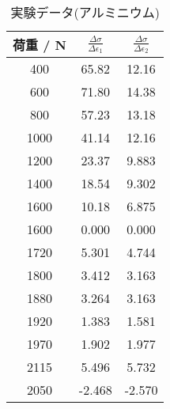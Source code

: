 \begin{table}[h]
  \caption{実験データ(アルミニウム)}
  \label{tab:data_al_2}
  \centering
  \begin{tabular}{ccc}
    \hline
    荷重 / N&$\frac{\Delta\sigma}{\Delta\epsilon_1}$&$\frac{\Delta\sigma}{\Delta\epsilon_2}$\\
    \hline \hline
    400 & 65.82 & 12.16  \\
600 & 71.80 & 14.38  \\
800 & 57.23 & 13.18  \\
1000 & 41.14 & 12.16  \\
1200 & 23.37 & 9.883  \\
1400 & 18.54 & 9.302  \\
1600 & 10.18 & 6.875  \\
1600 & 0.000 & 0.000  \\
1720 & 5.301 & 4.744  \\
1800 & 3.412 & 3.163  \\
1880 & 3.264 & 3.163  \\
1920 & 1.383 & 1.581  \\
1970 & 1.902 & 1.977  \\
2115 & 5.496 & 5.732  \\
2050 & -2.468 & -2.570 \\
    \hline
  \end{tabular}
\end{table}